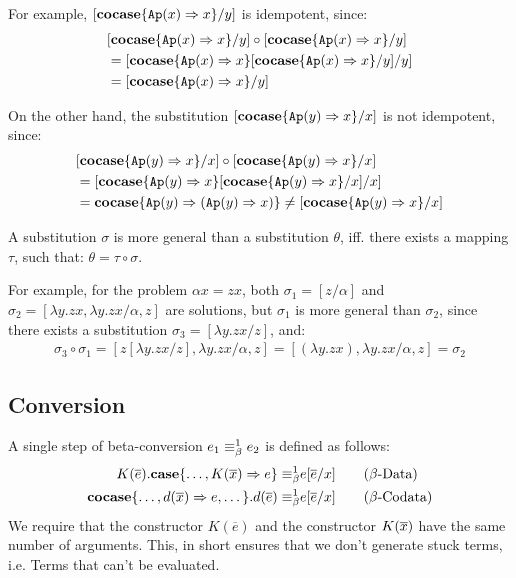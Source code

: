 \documentclass[twoside,12pt,a4paper]{article}
\begin{document}
For example, $[\textbf{cocase}\{\texttt{Ap}(x)\Rightarrow x\} / y]$ is idempotent, since:
\begin{align*}
    &[\textbf{cocase}\{\texttt{Ap}(x)\Rightarrow x\} / y] \circ [\textbf{cocase}\{\texttt{Ap}(x)\Rightarrow x\} / y] \\
    &= [\textbf{cocase}\{\texttt{Ap}(x)\Rightarrow x\}[\textbf{cocase}\{\texttt{Ap}(x)\Rightarrow x\} / y] / y] \\
    &= [\textbf{cocase}\{\texttt{Ap}(x)\Rightarrow x\} / y] 
\end{align*}

On the other hand, the substitution $[\textbf{cocase}\{\texttt{Ap}(y)\Rightarrow x\} / x]$ is not idempotent, since:
\begin{align*}
    &[\textbf{cocase}\{\texttt{Ap}(y)\Rightarrow x\} / x] \circ [\textbf{cocase}\{\texttt{Ap}(y)\Rightarrow x\} / x]\\ 
    &= [\textbf{cocase}\{\texttt{Ap}(y)\Rightarrow x\}[\textbf{cocase}\{\texttt{Ap}(y)\Rightarrow x\} / x] / x] \\
    &= \textbf{cocase}\{\texttt{Ap}(y)\Rightarrow (\texttt{Ap}(y)\Rightarrow x) \} \neq [\textbf{cocase}\{\texttt{Ap}(y)\Rightarrow x\} / x]
\end{align*}

\begin{definition} 
    A substitution $\sigma$ is more general than a substitution $\theta$, iff. there exists a mapping $\tau$, such that: $\theta = \tau \circ \sigma$.
\end{definition} %

For example, for the problem $\alpha x = zx$, both $\sigma_1 = [z/\alpha]$ and $\sigma_2 = [\lambda y.zx, \lambda y.zx/ \alpha, z]$ are solutions, %
but $\sigma_1$ is more general than $\sigma_2$, since there exists a substitution $\sigma_3 = [\lambda y.zx/z]$, and:
\begin{align*}
    \sigma_3 \circ \sigma_1 = [z[\lambda y.zx/z], \lambda y.zx /\alpha, z] = [(\lambda y.zx), \lambda y.zx /\alpha, z] = \sigma_2 %
\end{align*}


\subsection{Conversion}


\begin{definition}
    A single step of beta-conversion $e_1 \equiv_{\beta}^1 e_2$ is defined as follows:
    \begin{align*}
        K(\overline{e}).\textbf{case}\{\dots,K(\overline{x})\Rightarrow e\} 
        \equiv_{\beta}^1 & e[\overline{e}/x] \tag{$\beta$-Data}\\
        \textbf{cocase}\{\dots,d(\overline{x}) \Rightarrow e, \dots\}.d(\overline{e})
        \equiv_{\beta}^1 & e[\overline{e}/x]  \tag{$\beta$-Codata}
    \end{align*}
    We require that the constructor $K(\overline{e})$ and the constructor $K(\overline{x})$ have the same number of arguments.
    This, in short ensures that we don't generate stuck terms, i.e. Terms that can't be evaluated. %
\end{definition}
\end{document}
